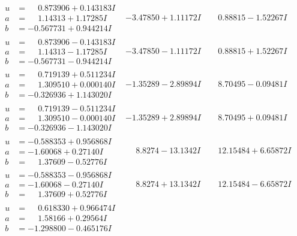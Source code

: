 \documentclass[1p]{elsarticle_modified}
\theoremstyle{definition}
\begin{document}
$$\begin{array}{c|c|c}
\begin{aligned}
u &= \phantom{-}0.873906 + 0.143183 I \\
a &= \phantom{-}1.14313 + 1.17285 I \\
b &= -0.567731 + 0.944214 I\end{aligned}
 & -3.47850 + 1.11172 I & \phantom{-}0.88815 - 1.52267 I \\ \hline\begin{aligned}
u &= \phantom{-}0.873906 - 0.143183 I \\
a &= \phantom{-}1.14313 - 1.17285 I \\
b &= -0.567731 - 0.944214 I\end{aligned}
 & -3.47850 - 1.11172 I & \phantom{-}0.88815 + 1.52267 I \\ \hline\begin{aligned}
u &= \phantom{-}0.719139 + 0.511234 I \\
a &= \phantom{-}1.309510 + 0.000140 I \\
b &= -0.326936 + 1.143020 I\end{aligned}
 & -1.35289 - 2.89894 I & \phantom{-}8.70495 - 0.09481 I \\ \hline\begin{aligned}
u &= \phantom{-}0.719139 - 0.511234 I \\
a &= \phantom{-}1.309510 - 0.000140 I \\
b &= -0.326936 - 1.143020 I\end{aligned}
 & -1.35289 + 2.89894 I & \phantom{-}8.70495 + 0.09481 I \\ \hline\begin{aligned}
u &= -0.588353 + 0.956868 I \\
a &= -1.60068 + 0.27140 I \\
b &= \phantom{-}1.37609 - 0.52776 I\end{aligned}
 & \phantom{-}8.8274 - 13.1342 I & \phantom{-}12.15484 + 6.65872 I \\ \hline\begin{aligned}
u &= -0.588353 - 0.956868 I \\
a &= -1.60068 - 0.27140 I \\
b &= \phantom{-}1.37609 + 0.52776 I\end{aligned}
 & \phantom{-}8.8274 + 13.1342 I & \phantom{-}12.15484 - 6.65872 I \\ \hline\begin{aligned}
u &= \phantom{-}0.618330 + 0.966474 I \\
a &= \phantom{-}1.58166 + 0.29564 I \\
b &= -1.298800 - 0.465176 I\end{aligned}

\end{array}$$
\end{document}
